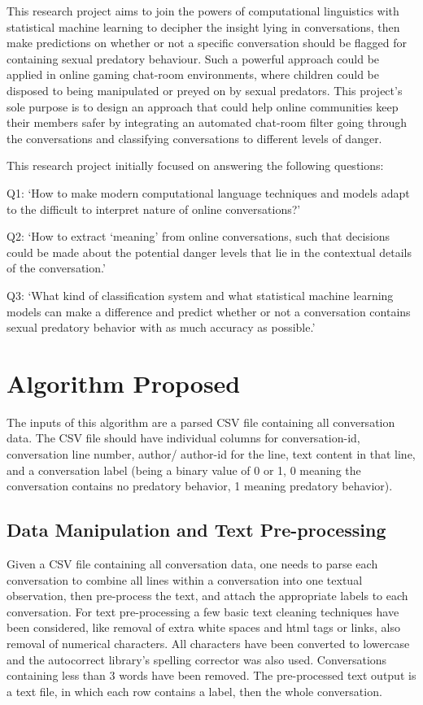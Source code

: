 \documentclass[11pt]{article}
\begin{document}
\indent This research project aims to join the powers of computational linguistics with statistical machine learning to decipher the insight lying in conversations, then make predictions on whether or not a specific conversation should be flagged for containing sexual predatory behaviour. Such a powerful approach could be applied in online gaming chat-room environments, where children could be disposed to being manipulated or preyed on by sexual predators. This project’s sole purpose is to design an approach that could help online communities keep their members safer by integrating an automated chat-room filter going through the conversations and classifying conversations to different levels of danger.

\indent This research project initially focused on answering the following questions:

Q1: ‘How to make modern computational language techniques and models adapt to the difficult to interpret nature of online conversations?’

Q2: ‘How to extract ‘meaning’ from online conversations, such that decisions could be made about the potential danger levels that lie in the contextual details of the conversation.’

Q3: ‘What kind of classification system and what statistical machine learning models can make a difference and predict whether or not a conversation contains sexual predatory behavior with as much accuracy as possible.’

\section{Algorithm Proposed}
The inputs of this algorithm are a parsed CSV file containing all conversation data. The CSV file should have individual columns for conversation-id, conversation line number, author/ author-id for the line, text content in that line, and a conversation label (being a binary value of 0 or 1, 0 meaning the conversation contains no predatory behavior, 1 meaning predatory behavior).

\subsection{Data Manipulation and Text Pre-processing}
Given a CSV file containing all conversation data, one needs to parse each conversation to combine all lines within a conversation into one textual observation, then pre-process the text, and attach the appropriate labels to each conversation. For text pre-processing a few basic text cleaning techniques have been considered, like removal of extra white spaces and html tags or links, also removal of numerical characters. All characters have been converted to lowercase and the autocorrect \cite{mccallum_2016} library's spelling corrector was also used. Conversations containing less than 3 words have been removed. The pre-processed text output is a text file, in which each row contains a label, then the whole conversation.
\end{document}
